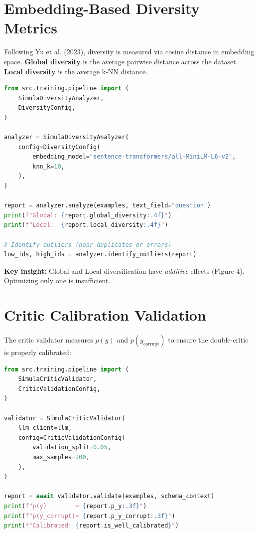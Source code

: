 \section{Embedding-Based Diversity Metrics}

Following Yu et al. (2023), diversity is measured via cosine distance in embedding
space. \textbf{Global diversity} is the average pairwise distance across the dataset.
\textbf{Local diversity} is the average k-NN distance.

\begin{lstlisting}[language=Python,caption={Diversity analyzer usage}]
from src.training.pipeline import (
    SimulaDiversityAnalyzer,
    DiversityConfig,
)

analyzer = SimulaDiversityAnalyzer(
    config=DiversityConfig(
        embedding_model="sentence-transformers/all-MiniLM-L6-v2",
        knn_k=10,
    ),
)

report = analyzer.analyze(examples, text_field="question")
print(f"Global: {report.global_diversity:.4f}")
print(f"Local:  {report.local_diversity:.4f}")

# Identify outliers (near-duplicates or errors)
low_ids, high_ids = analyzer.identify_outliers(report)
\end{lstlisting}

\textbf{Key insight:} Global and Local diversification have \emph{additive} effects
(Figure 4). Optimizing only one is insufficient.

\section{Critic Calibration Validation}

The critic validator measures $p(y)$ and $p(y_{\text{corrupt}})$ to ensure the
double-critic is properly calibrated:

\begin{lstlisting}[language=Python,caption={Critic validator usage}]
from src.training.pipeline import (
    SimulaCriticValidator,
    CriticValidationConfig,
)

validator = SimulaCriticValidator(
    llm_client=llm,
    config=CriticValidationConfig(
        validation_split=0.05,
        max_samples=200,
    ),
)

report = await validator.validate(examples, schema_context)
print(f"p(y)        = {report.p_y:.3f}")
print(f"p(y_corrupt)= {report.p_y_corrupt:.3f}")
print(f"Calibrated: {report.is_well_calibrated}")
\end{lstlisting}

